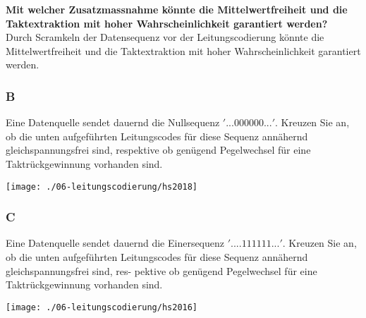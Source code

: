 \textbf{Mit welcher Zusatzmassnahme könnte die Mittelwertfreiheit und die Taktextraktion mit hoher Wahrscheinlichkeit garantiert werden?}\\
Durch Scramkeln der Datensequenz vor der Leitungscodierung könnte die Mittelwertfreiheit und die Taktextraktion mit hoher Wahrscheinlichkeit garantiert werden.

\subsubsection{B}
Eine Datenquelle sendet dauernd die Nullsequenz $'... 0 0 0 0 0 0 ...'$. Kreuzen Sie an, ob die unten aufgeführten Leitungscodes für diese Sequenz annähernd gleichspannungsfrei sind, respektive ob genügend Pegelwechsel für eine Taktrückgewinnung vorhanden sind.
\begin{center}
    \vspace{-8pt}
    \texttt{[image: ./06-leitungscodierung/hs2018]}
    \vspace{-8pt}
\end{center}

\subsubsection{C}
Eine Datenquelle sendet dauernd die Einersequenz $'....1 1 1 1 1 1 ...'$. Kreuzen Sie an, ob die unten aufgeführten Leitungscodes für diese Sequenz annähernd gleichspannungsfrei sind, res-
pektive ob genügend Pegelwechsel für eine Taktrückgewinnung vorhanden sind.
\begin{center}
    \vspace{-8pt}
    \texttt{[image: ./06-leitungscodierung/hs2016]}
    \vspace{-8pt}
\end{center}
